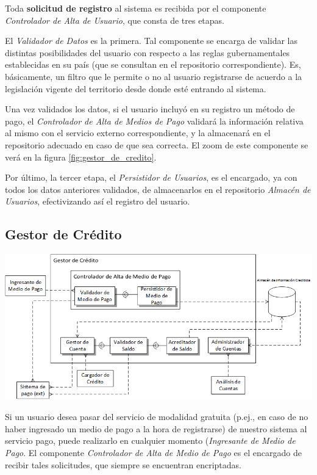 Toda \textbf{solicitud de registro} al sistema es recibida por el componente \emph{Controlador de Alta de Usuario}, que consta de tres etapas. 

El \emph{Validador de Datos} es la primera. Tal componente se encarga de validar las distintas posibilidades del usuario con respecto a las reglas gubernamentales establecidas en su país (que se consultan en el repositorio correspondiente). Es, básicamente, un filtro que le permite o no al usuario registrarse de acuerdo a la legislación vigente del territorio desde donde esté entrando al sistema.

Una vez validados los datos, si el usuario incluyó en su registro un método de pago, el \emph{Controlador de Alta de Medios de Pago} validará la información relativa al mismo con el servicio externo correspondiente, y la almacenará en el repositorio adecuado en caso de que sea correcta. El zoom de este componente se verá en la figura \ref{fig:gestor_de_credito}.

Por último, la tercer etapa, el \emph{Persistidor de Usuarios}, es el encargado, ya con todos los datos anteriores validados, de almacenarlos en el repositorio \emph{Almacén de Usuarios}, efectivizando así el registro del usuario.

\newpage
\subsection{Gestor de Crédito}
\begin{center}
\includegraphics[scale=0.80,angle=90]{diagramas/gestor_de_credito}
\label{fig:gestor_de_credito}
\end{center}

Si un usuario desea pasar del servicio de modalidad gratuita (p.ej., en caso de no haber ingresado un medio de pago a la hora de registrarse) de nuestro sistema al servicio pago, puede realizarlo en cualquier momento (\emph{Ingresante de Medio de Pago}. El componente \emph{Controlador de Alta de Medio de Pago} es el encargado de recibir tales solicitudes, que siempre se encuentran encriptadas.

